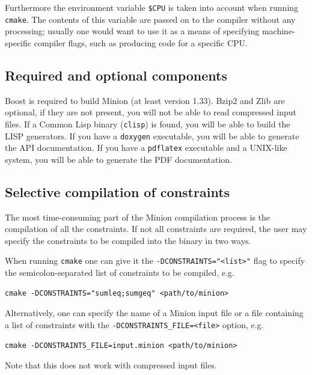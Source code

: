 \documentclass[oneside]{book}
\begin{document}
Furthermore the environment variable \verb+$CPU+ is taken into account when
running \texttt{cmake}. The contents of this variable are passed on to the
compiler without any processing; usually one would want to use it as a means of
specifying machine-specific compiler flags, such as producing code for a
specific CPU.

\subsection{Required and optional components}

Boost is required to build Minion (at least version 1.33). Bzip2 and Zlib are
optional, if they are not present, you will not be able to read compressed input
files. If a Common Lisp binary (\texttt{clisp}) is found, you will be able to
build the LISP generators. If you have a \texttt{doxygen} executable, you will
be able to generate the API documentation. If you have a \texttt{pdflatex}
executable and a UNIX-like system, you will be able to generate the PDF
documentation.

\subsection{Selective compilation of constraints}

The most time-consuming part of the Minion compilation process is the
compilation of all the constraints. If not all constraints are required, the
user may specify the constraints to be compiled into the binary in two ways.

When running \texttt{cmake} one can give it the \verb+-DCONSTRAINTS="<list>"+
flag to specify the semicolon-separated list of constraints to be compiled,
e.g.\
\begin{verbatim}
cmake -DCONSTRAINTS="sumleq;sumgeq" <path/to/minion>
\end{verbatim}

Alternatively, one can specify the name of a Minion input file or a file
containing a list of constraints with the \verb+-DCONSTRAINTS_FILE=<file>+
option, e.g.\
\begin{verbatim}
cmake -DCONSTRAINTS_FILE=input.minion <path/to/minion>
\end{verbatim}
Note that this does not work with compressed input files.
\end{document}
